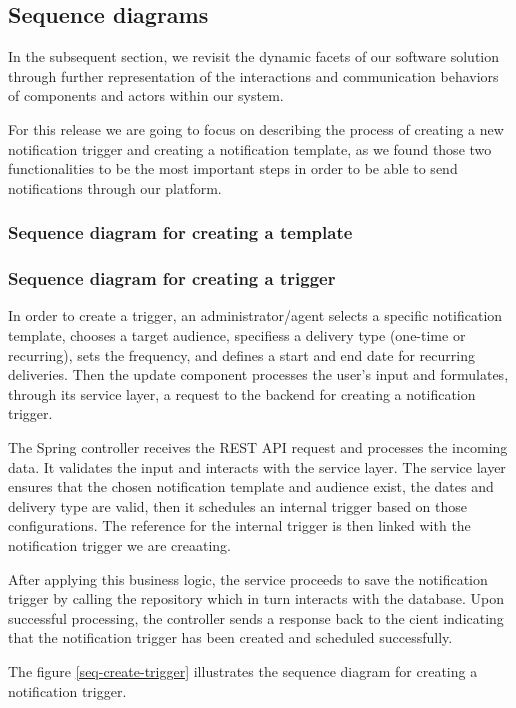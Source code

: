 \subsection{Sequence diagrams}
In the subsequent section, we revisit the dynamic facets of our software solution through further
representation of the interactions and communication behaviors of components and actors within our system.

For this release we are going to focus on describing the process of creating a new notification trigger and
creating a notification template, as we found those two functionalities to be the most important steps in
order to be able to send notifications through our platform.

\subsubsection{Sequence diagram for creating a template}


\subsubsection{Sequence diagram for creating a trigger}
In order to create a trigger, an administrator/agent selects a specific notification template, chooses a target
audience, specifiess a delivery type (one-time or recurring), sets the frequency, and defines a start and end
date for recurring deliveries. Then the update component processes the user's input and formulates, through
its service layer, a request to the backend for creating a notification trigger.

The Spring controller receives the REST API request and processes the incoming data. It validates the input
and interacts with the service layer. The service layer ensures that the chosen notification template and
audience exist, the dates and delivery type are valid, then it schedules an internal trigger based on those
configurations. The reference for the internal trigger is then linked with the notification trigger we are
creaating.

After applying this business logic, the service proceeds to save the notification trigger by calling
the repository which in turn interacts with the database. Upon successful processing, the controller sends
a response back to the cient indicating that the notification trigger has been created and scheduled successfully.

\noindent The figure \ref{seq-create-trigger} illustrates the sequence diagram for creating a notification trigger.


